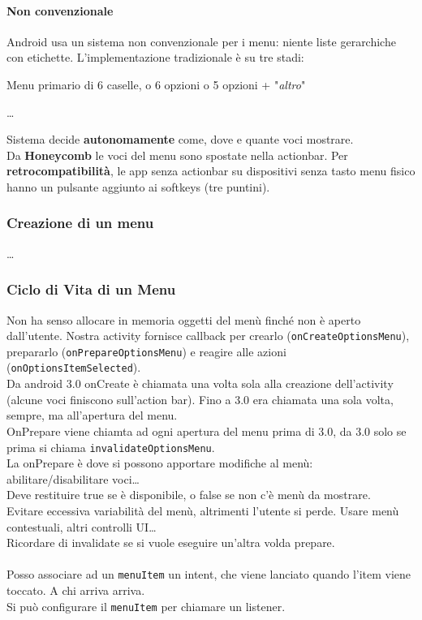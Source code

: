 \documentclass[10pt]{book}
\begin{document}
\paragraph{Non convenzionale} Android usa un sistema non convenzionale per i menu: niente liste gerarchiche con etichette. L'implementazione tradizionale è su tre stadi:\\
\begin{list}{}{}
	\item Menu primario di 6 caselle, o 6 opzioni o 5 opzioni + "\textit{altro}"
	\item \ldots
\end{list}
Sistema decide \textbf{autonomamente} come, dove e quante voci mostrare.\\
Da \textbf{Honeycomb} le voci del menu sono spostate nella actionbar. Per \textbf{retrocompatibilità}, le app senza actionbar su dispositivi senza tasto menu fisico hanno un pulsante aggiunto ai softkeys (tre puntini).\\
\subsubsection{Creazione di un menu}
\ldots
\subsubsection{Ciclo di Vita di un Menu}
Non ha senso allocare in memoria oggetti del menù finché non è aperto dall'utente. Nostra activity fornisce callback per crearlo (\texttt{onCreateOptionsMenu}), prepararlo (\texttt{onPrepareOptionsMenu}) e reagire alle azioni (\texttt{onOptionsItemSelected}).\\
Da android 3.0 onCreate è chiamata una volta sola alla creazione dell'activity (alcune voci finiscono sull'action bar). Fino a 3.0 era chiamata una sola volta, sempre, ma all'apertura del menu.\\
OnPrepare viene chiamta ad ogni apertura del menu prima di 3.0, da 3.0 solo se prima si chiama \texttt{invalidateOptionsMenu}.\\
La onPrepare è dove si possono apportare modifiche al menù: abilitare/disabilitare voci\ldots\\
Deve restituire true se è disponibile, o false se non c'è menù da mostrare.\\
Evitare eccessiva variabilità del menù, altrimenti l'utente si perde. Usare menù contestuali, altri controlli UI\ldots\\
Ricordare di invalidate se si vuole eseguire un'altra volda prepare.\\\\
Posso associare ad un \texttt{menuItem} un intent, che viene lanciato quando l'item viene toccato. A chi arriva arriva.\\
Si può configurare il \texttt{menuItem} per chiamare un listener.\\
\end{document}
